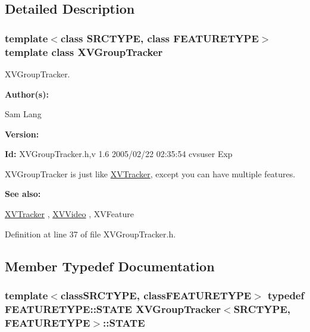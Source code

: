 \subsection{Detailed Description}
\subsubsection*{template$<$class SRCTYPE, class FEATURETYPE$>$  template class XVGroup\-Tracker}

XVGroup\-Tracker.

\begin{Desc}
\item[{\bf Author(s): }]\par
 Sam Lang \end{Desc}
\begin{Desc}
\item[{\bf Version: }]\par
 \end{Desc}
\begin{Desc}
\item[{\bf Id: }] XVGroup\-Tracker.h,v 1.6 2005/02/22 02:35:54 cvsuser Exp \end{Desc}


XVGroup\-Tracker is just like \hyperlink{class_XVTracker}{XVTracker}, except you can have multiple features.

\begin{Desc}
\item[{\bf See also: }]\par
 \hyperlink{class_XVTracker}{XVTracker} ,  \hyperlink{class_XVVideo}{XVVideo} ,  XVFeature \end{Desc}




Definition at line 37 of file XVGroup\-Tracker.h.

\subsection{Member Typedef Documentation}
\label{XVGroupTracker_s0}
\hypertarget{class_XVGroupTracker_s0}{
\subsubsection[STATE]{\setlength{\rightskip}{0pt plus 5cm}template$<$classSRCTYPE, classFEATURETYPE$>$ typedef FEATURETYPE::STATE XVGroup\-Tracker$<$SRCTYPE, FEATURETYPE$>$::STATE}}




